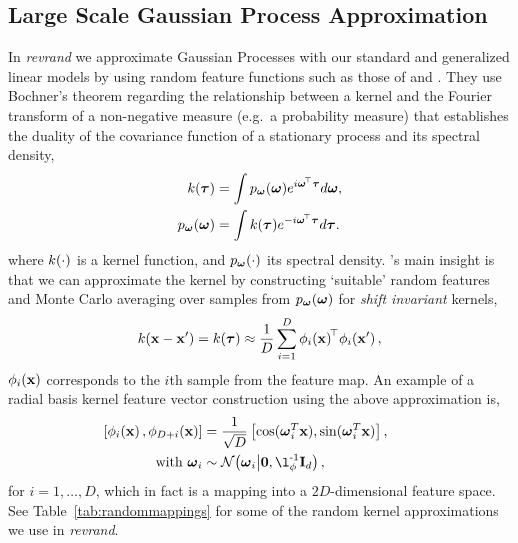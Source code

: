 \documentclass[11pt, oneside]{article}
\begin{document}
\subsection{Large Scale Gaussian Process Approximation}

In \emph{revrand} we approximate Gaussian Processes \citep{Rasmussen2006} with
our standard and generalized linear models by using random feature functions
such as those of \citeauthor{rahimi2007} \citeyearpar{rahimi2007,rahimi2008}
and \cite{le2013fastfood}. They use Bochner's theorem regarding the
relationship between a kernel and the Fourier transform of a non-negative
measure (e.g.~a probability measure) that establishes the duality of the
covariance function of a stationary process and its spectral density,
\begin{align}
	k(\boldsymbol{\tau}) &= \int p_{\boldsymbol{\omega}}(\boldsymbol{\omega}) 
    e^{i \boldsymbol{\omega}^{\!\top}  \boldsymbol{\tau}} d \boldsymbol{\omega},  \\
	p_{\boldsymbol{\omega}}(\boldsymbol{\omega}) &= \int k(\boldsymbol{\tau}) 
    e^{- i \boldsymbol{\omega}^{\!\top} \boldsymbol{\tau}}  d \boldsymbol{\tau}.
	\label{eq:fourier}
\end{align}
where $k(\cdot)$ is a kernel function, and $p_{\boldsymbol{\omega}}(\cdot)$ its
spectral density. \citeauthor{rahimi2007}'s  main insight
\citeyearpar{rahimi2007} is that we can approximate the kernel by constructing
`suitable' random features and Monte Carlo averaging over samples from
$p_{\boldsymbol{\omega}}(\boldsymbol{\omega})$ for \emph{shift invariant} kernels,
\begin{equation}
    k(\mathbf{x} - \mathbf{x}') = k(\boldsymbol{\tau}) 
    \approx \frac{1}{D} \sum_{i=1}^{D} \phi_{i}\!\left({{\mathbf{x}}}\right)^{\!\top}\!
	\phi_{i}\!\left({{\mathbf{x}'}}\right),
	\label{eq:mcapprox}
\end{equation}
$\phi_{i}\!\left({{\mathbf{x}}}\right)$ corresponds to the $i$th sample from the feature
map. An example of a radial basis kernel feature vector construction using the 
above approximation is,
\begin{align}
	\nonumber
    \sbrac{\singlefeatfunc{\inss}{i}, \singlefeatfunc{\inss}{D+i}}&= 
    \frac{1}{\sqrt{D}} \sbrac{\cos(\ffourier_i^T \inss), 
    \sin(\ffourier_i^T \inss)}, \qquad \\
    \text{with}~\ffourier_i & \sim 
    \gausC{\ffourier_i}{\mathbf{0}, \lenscale\inv \ident{d}},
\end{align}
for $i=1, \ldots, D$,  which in fact is a mapping into a $2 D$-dimensional
feature space. See Table~\ref{tab:randommappings} for some of the random kernel
approximations we use in \emph{revrand}.
\end{document}
